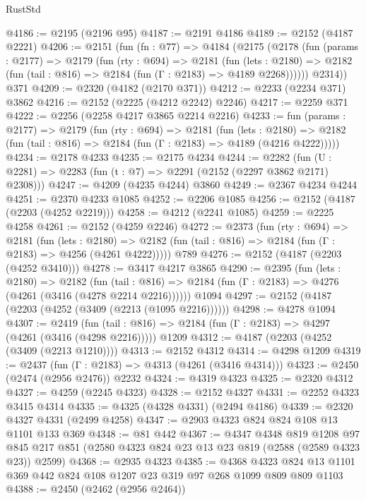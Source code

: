 \begin{lexlean}{RustStd}
\begin{coremodule}
@4186 := @2195 (@2196 @95)
@4187 := @2191 @4186
@4189 := @2152 (@4187 @2221)
@4206 := @2151
    (fun (fn : @77) =>
    @4184
      (@2175
        (@2178
          (fun (params : @2177) =>
          @2179
            (fun (rty : @694) =>
            @2181
              (fun (lets : @2180) =>
              @2182 (fun (tail : @816) => @2184 (fun (Γ : @2183) => @4189 @2268))))))
        @2314))
    @371
@4209 := @2320 (@4182 (@2170 @371))
@4212 := @2233 (@2234 @371) @3862
@4216 := @2152 (@2225 (@4212 @2242) @2246)
@4217 := @2259 @371
@4222 := @2256 (@2258 @4217 @3865 @2214 @2216)
@4233 := fun (params : @2177) =>
  @2179
    (fun (rty : @694) =>
    @2181
      (fun (lets : @2180) =>
      @2182 (fun (tail : @816) => @2184 (fun (Γ : @2183) => @4189 (@4216 @4222)))))
@4234 := @2178 @4233
@4235 := @2175 @4234
@4244 := @2282 (fun (U : @2281) => @2283 (fun (t : @7) => @2291 (@2152 (@2297 @3862 @2171) @2308)))
@4247 := @4209 (@4235 @4244) @3860
@4249 := @2367 @4234 @4244
@4251 := @2370 @4233 @1085
@4252 := @2206 @1085
@4256 := @2152 (@4187 (@2203 (@4252 @2219)))
@4258 := @4212 (@2241 @1085)
@4259 := @2225 @4258
@4261 := @2152 (@4259 @2246)
@4272 := @2373
    (fun (rty : @694) =>
    @2181
      (fun (lets : @2180) =>
      @2182 (fun (tail : @816) => @2184 (fun (Γ : @2183) => @4256 (@4261 @4222)))))
    @789
@4276 := @2152 (@4187 (@2203 (@4252 @3410)))
@4278 := @3417 @4217 @3865
@4290 := @2395
    (fun (lets : @2180) =>
    @2182
      (fun (tail : @816) => @2184 (fun (Γ : @2183) => @4276 (@4261 (@3416 (@4278 @2214 @2216))))))
    @1094
@4297 := @2152 (@4187 (@2203 (@4252 (@3409 (@2213 (@1095 @2216))))))
@4298 := @4278 @1094
@4307 := @2419
    (fun (tail : @816) => @2184 (fun (Γ : @2183) => @4297 (@4261 (@3416 (@4298 @2216)))))
    @1209
@4312 := @4187 (@2203 (@4252 (@3409 (@2213 @1210))))
@4313 := @2152 @4312
@4314 := @4298 @1209
@4319 := @2437 (fun (Γ : @2183) => @4313 (@4261 (@3416 @4314)))
@4323 := @2450 (@2474 (@2956 @2476)) @2232
@4324 := @4319 @4323
@4325 := @2320 @4312
@4327 := @4259 (@2245 @4323)
@4328 := @2152 @4327
@4331 := @2252 @4323 @3415 @4314
@4335 := @4325 (@4328 @4331) (@2494 @4186)
@4339 := @2320 @4327 @4331 (@2499 @4258)
@4347 := @2903 @4323 @824 @824 @108 @13 @1101 @133 @369
@4348 := @81 @442
@4367 := @4347
    @4348
    @819
    @1208
    @97
    @845
    @217
    @851
    (@2580 @4323 @824 @23 @13 @23 @819 (@2588 (@2589 @4323 @23)) @2599)
@4368 := @2935 @4323
@4385 := @4368
    @4323
    @824
    @13
    @1101
    @369
    @442
    @824
    @108
    @1207
    @23
    @319
    @97
    @268
    @1099
    @809
    @809
    @1103
@4388 := @2450 (@2462 (@2956 @2464))

\end{coremodule}
\end{lexlean}
